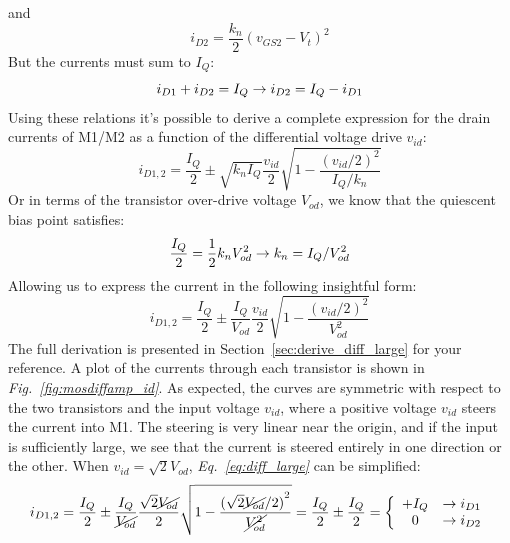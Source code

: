 and
    \begin{equation} 
        {i_{D2}} = \frac{{{k_n}}}{2}{\left( {{v_{GS2}} - {V_t}} \right)^2}
    \end{equation}
But the currents must sum to $I_Q$:
    \begin{equation}
        {i_{D1}} + {i_{D2}} = I_Q \rightarrow {\rm{ }}{i_{D2}} = I_Q - {i_{D1}}
    \end{equation}
Using these relations it's possible to derive a complete expression for the drain currents of M1/M2 as a function of the differential voltage drive $v_{id}$:
    \begin{equation}
        {i_{D1,2}} = \frac{I_Q}{2} \pm \sqrt {{k_n}I_Q} \frac{{{v_{id}}}}{2}\sqrt {1 - \frac{{{{({v_{id}}/2)}^2}}}{{I_Q/{k_n}}}} 
    \end{equation}
Or in terms of the transistor over-drive voltage $V_{od}$, we know that the quiescent bias point satisfies:
    \begin{equation}
        \frac{I_Q}{2} = \frac{1}{2}{k_n}V_{od}^2{\rm{ }} \rightarrow {k_n} = I_Q/V_{od}^2 
    \end{equation}
Allowing us to express the current in the following insightful form:
    \begin{equation} 
        {i_{D1,2}} = \frac{I_Q}{2} \pm \frac{I_Q}{{{V_{od}}}}\frac{{{v_{id}}}}{2}\sqrt {1 - \frac{{{{({v_{id}}/2)}^2}}}{{V_{od}^2}}}
        \label{eq:diff_large}
    \end{equation}
The full derivation is presented in Section~\ref{sec:derive_diff_large} for your reference.  A plot of the currents through each transistor is shown in \emph{Fig.~\ref{fig:mosdiffamp_id}}.  As expected, the curves are symmetric with respect to the two transistors and the input voltage $v_{id}$, where a positive voltage $v_{id}$ steers the current into M1.  The steering is very linear near the origin, and if the input is sufficiently large, we see that the current is steered entirely in one direction or the other.  When $v_{id} = \sqrt{2} V_{od}$, \emph{Eq.~\ref{eq:diff_large}} can be simplified:
    \begin{equation} 
        {i_{D1,2}} = \frac{I_Q}{2} \pm \frac{I_Q}{{{\cancel{V_{od}}}}}\frac{{{\sqrt{2} \cancel{V_{od}}}}}{2} \sqrt {1 - \frac{{{{({\sqrt{2}\cancel{V_{od}}}/2)}^2}}}{{\cancel{V_{od}^2}}}}	= \frac{I_Q}{2} \pm \frac{I_Q}{2} = \left\{ \begin{array}{cc} +I_Q &  \to i_{D1} \\ 0 & \to i_{D2} \end{array} \right.
    \end{equation}

